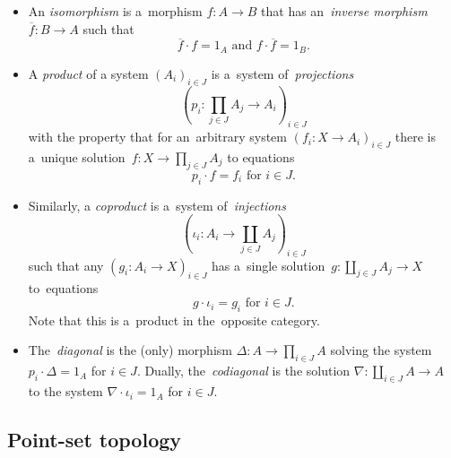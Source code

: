 \begin{itemize}
\item An \emph{isomorphism} is a~morphism $f\colon A \to B$ that has
an~\emph{inverse morphism\/} $\overline{f}\colon B \to A$ such that
\[
  \overline{f} \cdot f = 1_A \text{ and } f \cdot \overline{f} = 1_B.
\]
\end{itemize}

\begin{itemize}
\item A \emph{product} of a system $\left(A_i\right)_{i\in J}$ is a~system
of~\emph{projections\/}
\[
  \left(p_i\colon \prod_{j\in J} A_j \to A_i \right)_{i\in J}
\]
with the property that for an~arbitrary system $\left(f_i\colon X \to
A_i\right)_{i\in J}$ there is a~unique solution~$f\colon X \to \prod_{j\in
J} A_j$ to equations
\[
  p_i \cdot f = f_i \text{ for } i\in J.
\]

\item Similarly, a \emph{coproduct} is a~system of~\emph{injections\/}
\[
  \left(\iota_i\colon A_i \to \coprod_{j\in J} A_j \right)_{i\in J}
\]
such that any $\left(g_i\colon A_i \to X \right)_{i\in J}$ has a~single
solution~$g\colon \coprod_{j\in J} A_j \to X$ to~equations
\[
  g \cdot \iota_i = g_i \text{ for } i\in J.
\]
Note that this is a~product in the~opposite category.

\item The~\emph{diagonal} is the (only) morphism $\Delta\colon A \to \prod_{i\in
J} A$ solving the system $p_i\cdot \Delta = 1_A$ for $i \in J$.
Dually, the~\emph{codiagonal} is the solution $\nabla\colon \coprod_{i\in J} A
\to A$ to the system $\nabla\cdot \iota_i = 1_A$ for $i \in J$.
\end{itemize}


\subsection*{Point-set topology}

